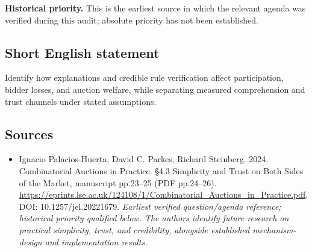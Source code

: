 \documentclass[11pt]{article}
\begin{document}
\par\textbf{Historical priority.} This is the earliest source in which the relevant agenda was verified during this audit; absolute priority has not been established.

\subsection{Short English statement}
Identify how explanations and credible rule verification affect participation, bidder losses, and auction welfare, while separating measured comprehension and trust channels under stated assumptions.

\subsection{Sources}
\begin{itemize}\raggedright
\item[\textnormal{[S1]}]\hypertarget{source:30007577:1}{} Ignacio Palacios-Huerta, David C. Parkes, Richard Steinberg. 2024. Combinatorial Auctions in Practice. §4.3 Simplicity and Trust on Both Sides of the Market, manuscript pp.23–25 (PDF pp.24–26).
\url{https://eprints.lse.ac.uk/124108/1/Combinatorial_Auctions_in_Practice.pdf}.
DOI: 10.1257/jel.20221679.
{\small\textit{Earliest verified question/agenda reference; historical priority qualified below. The authors identify future research on practical simplicity, trust, and credibility, alongside established mechanism-design and implementation results.}}
\end{itemize}
\end{document}
